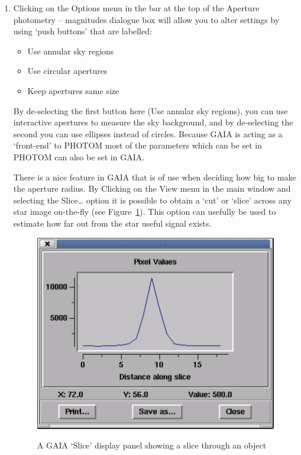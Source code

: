 \documentclass[twoside,11pt]{starlink}
\begin{document}
\begin{enumerate}
  \item Clicking on the \textsf{Options} menu in the bar at the top of the
   \textsf{Aperture photometry -- magnitudes} dialogue box will allow you to
   alter settings by using `push buttons' that are labelled:

  \begin{itemize}

     \item \textsf{Use annular sky regions}

     \item \textsf{Use circular apertures}

     \item \textsf{Keep apertures same size}

  \end{itemize}

   By de-selecting the first button here (\textsf{Use annular sky
   regions}), you can use interactive apertures to measure the sky
   background, and by de-selecting the second you can use ellipses
   instead of circles.  Because GAIA is acting as a `front-end' to
   PHOTOM most of the parameters which can be set in PHOTOM can also
   be set in GAIA.

   There is a nice feature in GAIA that is of use when deciding how
   big to make the aperture radius. By Clicking on the \textsf{View} menu
   in the main window and selecting the \textsf{Slice\ldots} option it is
   possible to obtain a `cut' or `slice' across any star image on-the-fly
   (see Figure~\ref{PHOTOM_R_SLICE}).  This option can usefully be used to
   estimate how far out from the star useful signal exists.

  \begin{figure}[htbp]
     \centering
     \includegraphics[totalheight=3.25in]{sc17_photom_r_slice}
     \begin{quote}
     \caption[A GAIA `\textsf{Slice}' display panel]
      {A GAIA `\textsf{Slice}' display panel showing a slice through an object
     \label{PHOTOM_R_SLICE} }
     \end{quote}
  \end{figure}


\end{enumerate}
\end{document}
